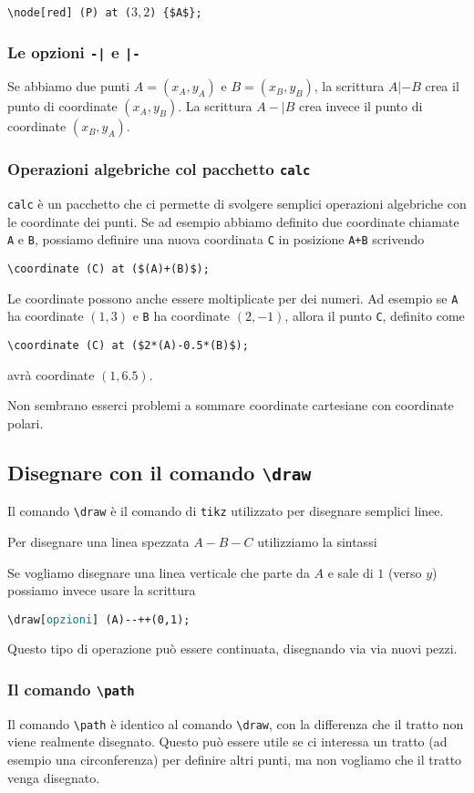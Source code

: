 \documentclass[italian, a4paper]{article}
\newcommand{\bs}{\textbackslash}
\newcommand{\ttt}[1]{\texttt{#1}}
\newcommand{\codice}[2][\large]{\vspace*{1mm}\noindent\fbox{\parbox{\textwidth}{#1\ttt{#2}}}}
\newcommand{\comando}[2][\large]{\codice[#1]{#2}\vspace*{3mm}}
\newcommand{\blue}[1]{\textcolor{blue}{#1}}
\newcommand{\opzioni}{\textcolor{teal}{\ttt{opzioni}}}
\newcommand{\dash}{{-}{-}}
\begin{document}
\ttt{\bs node[red] (P) at ($3,2$) \{\$A\$\};}

\subsubsection{Le opzioni \ttt{-|} e \ttt{|-}}
Se abbiamo due punti $A=(x_A,y_A)$ e $B=(x_B,y_B)$, la scrittura $A|-B$ crea il punto di coordinate $(x_A,y_B)$. La scrittura $A-|B$ crea invece il punto di coordinate $(x_B,y_A)$.

\subsubsection{Operazioni algebriche col pacchetto \ttt{calc}}
\ttt{calc} è un pacchetto che ci permette di svolgere semplici operazioni algebriche con le coordinate dei punti. Se ad esempio abbiamo definito due coordinate chiamate \ttt{A} e \ttt{B}, possiamo definire una nuova coordinata \ttt{C} in posizione \ttt{A+B} scrivendo

\ttt{\bs coordinate (C) at (\$(A)+(B)\$);}

Le coordinate possono anche essere moltiplicate per dei numeri. Ad esempio se \ttt{A} ha coordinate $(1,3)$ e \ttt{B} ha coordinate $(2,-1)$, allora il punto \ttt{C}, definito come

\ttt{\bs coordinate (C) at (\$2*(A)-0.5*(B)\$);}

avrà coordinate $(1,6.5)$.

Non sembrano esserci problemi a sommare coordinate cartesiane con coordinate polari.

\subsection{Disegnare con il comando \ttt{\bs draw}}
Il comando \ttt{\bs draw} è il comando di \ttt{tikz} utilizzato per disegnare semplici linee.

Per disegnare una linea spezzata $A-B-C$ utilizziamo la sintassi

\comando{\bs draw[\opzioni] (\blue{A})\dash(\blue{B})\dash(\blue{C});}

Se vogliamo disegnare una linea verticale che parte da $A$ e sale di $1$ (verso $y$) possiamo invece usare la scrittura

\ttt{\bs draw[\opzioni] (A)\dash++(0,1);}

Questo tipo di operazione può essere continuata, disegnando via via nuovi pezzi.

\subsubsection{Il comando \ttt{\bs path}}
Il comando \ttt{\bs path} è identico al comando \ttt{\bs draw}, con la differenza che il tratto non viene realmente disegnato. Questo può essere utile se ci interessa un tratto (ad esempio una circonferenza) per definire altri punti, ma non vogliamo che il tratto venga disegnato.
\end{document}
